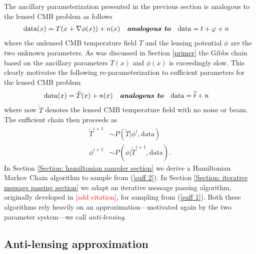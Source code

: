 \documentclass[noinfoline]{imsart}
\begin{document}
The ancillary parameterization presented in the previous section is analogous to the lensed CMB problem as follows
\begin{align*}
  \text{data}(x) &= T(x+\nabla \phi(x)) + n(x)\quad\text{\bf\em analogous to}\quad
  \text{data} =  t +\varphi + n
\end{align*}
where the unlensed  CMB temperature field $T$ and the lensing potential $\phi$ are the two unknown parameters. As was discussed in Section \ref{primer} the Gibbs chain based on the ancillary parameters $T(x)$ and $\phi(x)$ is exceedingly slow.  This clearly motivates the following re-parameterization to sufficient parameters for the lensed CMB problem 
\begin{align*}
  \text{data}(x) &= \widetilde T(x) + n(x) \quad\text{\bf\em analogous to}\quad
  \text{data} =  \widetilde t + n
\end{align*}
where now $\widetilde T$ denotes the lensed CMB temperature field with no noise or beam.
The sufficient chain then proceeds as
\begin{align}
\label{suff 1} \widetilde T^{i+1}&\sim P(\widetilde T |  \phi^{i},\text{data}) \\
\label{suff 2} \phi^{i+1}&\sim P(\phi | \widetilde T^{i+1},  \text{data}).
\end{align}
In Section \ref{Section: hamiltonian sampler section} we derive a Hamiltonian Markov Chain algorithm to sample from (\ref{suff 2}). In Section \ref{Section: iterative message passing section} we adapt an iterative message passing algorithm, originally developed in \textcolor{red}{[add citation]}, for sampling from (\ref{suff 1}). Both these algorithms rely heavily on an approximation---motivated again by the two parameter system---we call {\em anti-lensing}.







%
%
\subsection{Anti-lensing approximation}
\end{document}

